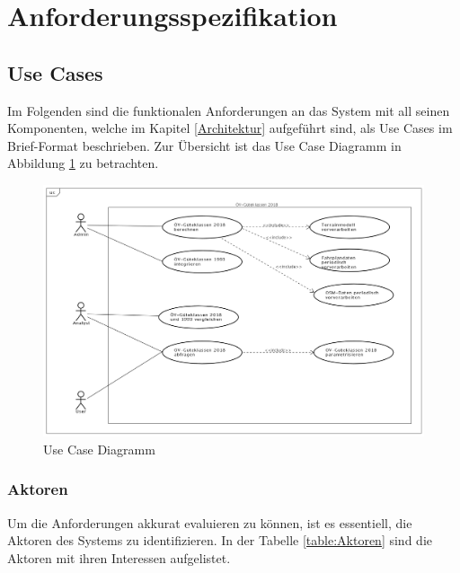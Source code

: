 
\section{Anforderungsspezifikation}
\label{Anforderungsspezifikation}

\subsection{Use Cases}
\label{Anforderungsspezifikation:Use Cases}

Im Folgenden sind die funktionalen Anforderungen an das System mit all seinen Komponenten, welche im Kapitel \ref{Architektur} aufgeführt sind, als Use Cases im Brief-Format beschrieben.
Zur Übersicht ist das Use Case Diagramm in Abbildung \ref{fig:UseCase_OeV-Gueteklassen_2018} zu betrachten.

\begin{figure}[ht]
\centering
\includegraphics[width=1.0\linewidth]{projectdoc/img/UseCase_OeV-Gueteklassen_2018}
\caption[Use Case Diagramm]{Use Case Diagramm}
\label{fig:UseCase_OeV-Gueteklassen_2018}
\end{figure}

\subsubsection{Aktoren}
\label{Use Cases:Aktoren}

Um die Anforderungen akkurat evaluieren zu können, ist es essentiell, die Aktoren des Systems zu identifizieren.
In der Tabelle \ref{table:Aktoren} sind die Aktoren mit ihren Interessen aufgelistet.

